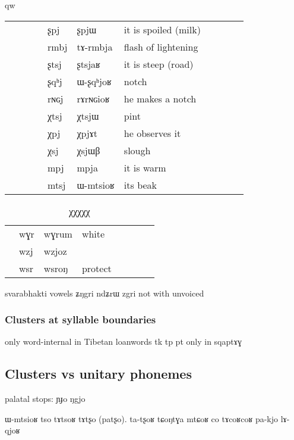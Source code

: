 qw\documentclass[oldfontcommands,oneside,a4paper,11pt]{article}
\newcommand{\ipa}[1]{{\phon #1}} %
\newcommand{\tib}[1]{\cellcolor{lightgray}\textbf{#1}}
\begin{document}
\begin{table}
{\begin{tabular}{l|lll|lll|lll|l}
 &	 &	&&\ipa{ʂpj} &	\ipa{ʂpjɯ} &	it is spoiled (milk)\\
 &	 &	&&\ipa{rmbj} &	\ipa{tɤ-rmbja} &	flash of lightening\\
 &	 &	&&\ipa{ʂtsj} &	\ipa{ʂtsjaʁ} &it is steep (road)	\\
 &	 &	&&\ipa{ʂqʰj} &	\ipa{ɯ-ʂqʰjoʁ} &notch	\\
 &	 &	&&\ipa{rɴɢj} &	\ipa{rɤrɴɢioʁ} &	he makes a notch\\
\midrule
 &	 &	&&\ipa{χtsj} &	\ipa{χtsjɯ} &pint	\\
 &	 &	&&\ipa{χpj} \tib{}&	\ipa{χpjɤt} &he  observes it	\\
 &	 &	&&\ipa{χsj} &	\ipa{χsjɯβ} &	slough \\
\midrule
 &	 &	&&\ipa{mpj} &	\ipa{mpja} &	it is warm\\
 &	 &	&&\ipa{mtsj} &	\ipa{ɯ-mtsioʁ} &its beak	\\
\end{tabular}}
\end{table}
  
 \begin{table}
 \caption{χχχχχ}
\begin{tabular}{llllllll}
&	\ipa{wɣr}  &	\ipa{wɣrum}  &white	\\
&	\ipa{wzj}  &	\ipa{wzjoz}  &	\\
  &	\ipa{wsr}  &	\ipa{wsroŋ}  &protect	\\
\end{tabular}


  \end{table} 
  
    
  
 svarabhakti vowels \ipa{ʑŋgri} \ipa{ndʑrɯ} \ipa{zgri} not with unvoiced
 
 
 
 \subsubsection{Clusters at syllable boundaries}
 only word-internal in Tibetan loanwords tk tp 
 pt only in \ipa{sqaptɤɣ}
 
 
      \subsection{Clusters vs unitary phonemes} \label{sec:non.clusters}
      
      
palatal stops:      
      \ipa{ɲɟo} \ipa{ŋgjo}
      
      ɯ-mtsioʁ
	tso tɤtsoʁ 
	tɤtʂo (patʂo). ta-tʂoʁ
 tɕoŋtɣa mtɕoʁ
 co tɤcoʁcoʁ
 pa-kjo
     lɤ-qjoʁ
\end{document}
